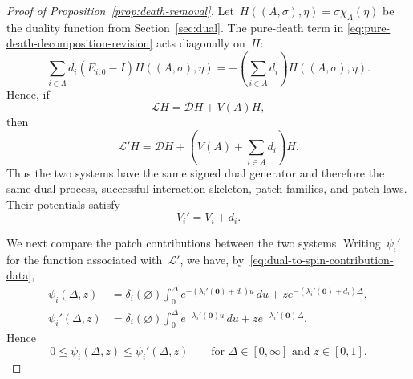\documentclass[EJP,preprint,NODS,nobera]{ejpecp}
\newcommand{\bb}[1]{\left(#1\right)}
\newcommand{\mb}[1]{\mathbf{#1}}
\newcommand{\Lcal}{\mathcal{L}}
\newcommand{\Dcal}{\mathcal{D}}
\begin{document}
\begin{proof}[Proof of Proposition~\ref{prop:death-removal}]
Let~$H((A,\sigma),\eta)=\sigma\chi_A(\eta)$ be the duality function from
Section~\ref{sec:dual}. The pure-death term in
\eqref{eq:pure-death-decomposition-revision} acts diagonally on~$H$:
\begin{equation*}
\sum_{i\in\Lambda}d_i\bb{E_{i,0}-I}H((A,\sigma),\eta)
=
-\bb{\sum_{i\in A}d_i}H((A,\sigma),\eta).
\end{equation*}
Hence, if
\begin{equation*}
\Lcal H
=
\Dcal H+V(A)H,
\end{equation*}
then
\begin{equation*}
\Lcal'H
=
\Dcal H
+
\bb{V(A)+\sum_{i\in A}d_i}H.
\end{equation*}
Thus the two systems have the same signed dual generator and therefore the same
dual process, successful-interaction skeleton, patch families, and
patch laws. Their potentials satisfy
\begin{equation}
\label{eq:pure-death-potential-comparison}
V_i'=V_i+d_i.
\end{equation}

We next compare the patch contributions between the two systems. Writing~$\psi_i'$ for the function associated with~$\Lcal'$, we
have, by~\eqref{eq:dual-to-spin-contribution-data},
\begin{align*}
\psi_i(\Delta,z)
&=
\delta_i(\varnothing)
\int_0^\Delta
e^{-\bb{\lambda_i'(\mb 0)+d_i}u}\,du
+
z e^{-\bb{\lambda_i'(\mb 0)+d_i}\Delta},
\\
\psi_i'(\Delta,z)
&=
\delta_i(\varnothing)
\int_0^\Delta
e^{-\lambda_i'(\mb 0)u}\,du
+
z e^{-\lambda_i'(\mb 0)\Delta}.
\end{align*}
Hence
\begin{equation}
\label{eq:pure-death-psi-comparison}
0\leq\psi_i(\Delta,z)\leq\psi_i'(\Delta,z)
\qquad
\text{for }\Delta\in[0,\infty]\text{ and }z\in[0,1].
\end{equation}


\end{proof}
\end{document}
